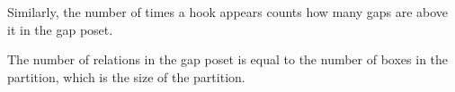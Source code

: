 Similarly, the number of times a hook appears counts how many gaps are above it in the gap poset.

\begin{corollarly}
The number of relations in the gap poset is equal to the number of boxes in the partition, which is the size of the partition.
\end{corollarly}

\iffalse
\begin{proof}
    Each relation in the gap poset corresponds to a box in the Ferrers diagram of the partition. Since every box represents a unique relation where a hook \( h \) can be determined from a gap \( f \) and a semigroup element \( s \), the total number of such relations is precisely the number of boxes in the partition.
\end{proof}
\fi